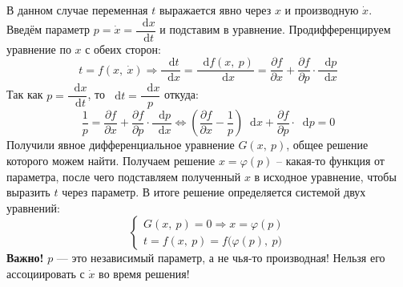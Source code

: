 \documentclass[a4paper,12pt]{article}
\renewcommand*\d{\mathop{}\!\mathrm{d}}
\newcommand{\dx}{\dot{x}}
\newcommand{\fe}{\varphi}
\newcommand{\bto}{\Longrightarrow}
\begin{document}
В данном случае переменная $t$ выражается явно через $x$ и производную $\dx$. Введём параметр $p = \dx = \dfrac{\d x}{\d t}$ и подставим в уравнение. Продифференцируем уравнение по $x$ с обеих сторон:
\[t = f(x,\ \dx) \bto \dfrac{\d t}{\d x} = \dfrac{\d f(x,\ p)}{\d x} = \dfrac{\partial f}{\partial x} + \dfrac{\partial f}{\partial p} \cdot \dfrac{\d p}{\d x} \]
Так как $p = \dfrac{\d x}{\d t}$, то $\d t = \dfrac{\d x}{p}$ откуда:
\[\dfrac{1}{p} =  \dfrac{\partial f}{\partial x} + \dfrac{\partial f}{\partial p} \cdot \dfrac{\d p}{\d x} \iff \left(\dfrac{\partial f}{\partial x} - \dfrac{1}{p}\right)\d x + \dfrac{\partial f}{\partial p} \cdot \d p = 0 \]
Получили явное дифференциальное уравнение $G(x,\ p)$, общее решение которого можем найти. Получаем решение $x = \fe(p)$ -- какая-то функция от параметра, после чего подставляем полученный $x$ в исходное уравнение, чтобы выразить $t$ через параметр. В итоге решение определяется системой двух уравнений:
\[\begin{cases}
	G(x,\ p) = 0 \bto x = \fe(p)\\
	t = f(x,\ p) = f\big(\fe(p),\ p\big)
\end{cases}\]
\textbf{Важно!} $p$ --- это независимый параметр, а не чья-то производная! Нельзя его ассоциировать с $\dx$ во время решения!
\end{document}
